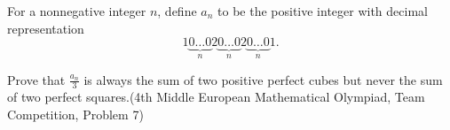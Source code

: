 For a nonnegative integer $n$,  define $a_n$ to be the positive integer with decimal representation\[1\underbrace{0\ldots0}_{n}2\underbrace{0\ldots0}_{n}2\underbrace{0\ldots0}_{n}1\mbox{.}\]

Prove that $\frac{a_n}{3}$ is always the sum of two positive perfect cubes but never the sum of two perfect squares.(4th Middle European Mathematical Olympiad, Team Competition, Problem 7)